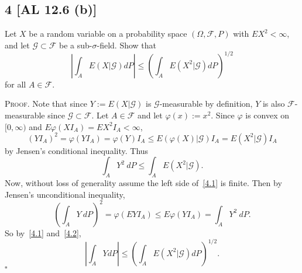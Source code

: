 \documentclass[12pt]{article}
\newcounter{ProofCounter}
\newenvironment{Proof}{\stepcounter{ProofCounter}\textsc{Proof.}}{\hfill$\square$}
\begin{document}
\subsection*{4 [AL 12.6 (b)]}
\begin{tcolorbox}
  Let $X$ be a random variable on a probability space $(\Omega, \mathcal{F}, P)$ with $EX^{2} < \infty$, and let $\mathcal{G} \subset \mathcal{F}$ be
  a sub-$\sigma$-field. Show that 
  \[ \left| \int_{A} E(X|\mathcal{G}) dP\right| \leq \left( \int_{A}E(X^{2}|\mathcal{G})dP \right)^{1/2} \]
  for all $A \in \mathcal{F}$.
\end{tcolorbox}
\begin{Proof}
  Note that since $Y := E(X|\mathcal{G})$ is $\mathcal{G}$-measurable by definition, $Y$ is also $\mathcal{F}$-measurable since $\mathcal{G}
  \subset \mathcal{F}$. Let $A \in \mathcal{F}$ and let $\varphi(x) := x^{2}$. Since $\varphi$ is convex on $[0,\infty)$ and %
  $E\varphi(XI_{A}) = EX^{2}I_{A} < \infty$,
  \[
    (YI_{A})^{2} = \varphi(YI_{A}) = \varphi(Y)I_{A} \leq E(\varphi(X) | \mathcal{G})I_{A} = E(X^{2}|\mathcal{G})I_{A} 
  \]
  by Jensen's conditional inequality. Thus 
  \begin{equation}
    \int_{A}Y^{2}\ dP \leq \int_{A} E(X^{2} | \mathcal{G}).
    \label{4.1}
  \end{equation}
  Now, without loss of generality assume the left side of~\eqref{4.1} is finite. Then by Jensen's unconditional inequality,
  \begin{equation}
    \left( \int_{A}Y\ dP \right)^{2} = \varphi(EYI_{A}) \leq E\varphi(YI_{A}) = \int_{A}Y^{2}\ dP. 
    \label{4.2}
  \end{equation}
  So by~\eqref{4.1} and~\eqref{4.2},
  \[ \left| \int_{A} Y dP\right| \leq \left( \int_{A}E(X^{2}|\mathcal{G})dP \right)^{1/2}. \]
\end{Proof}
\end{document}
